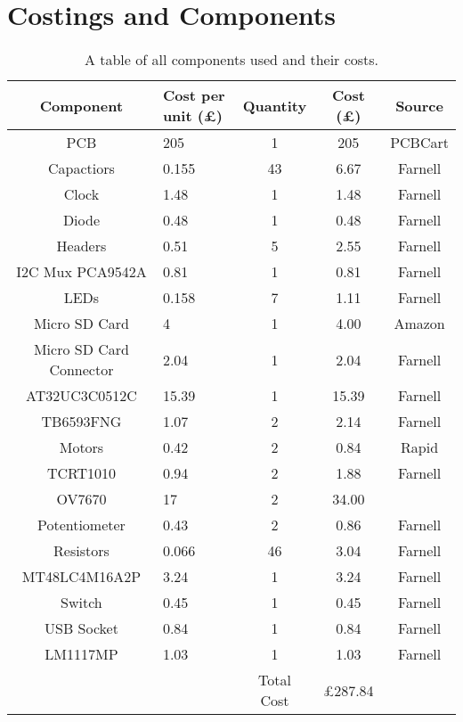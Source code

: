 \chapter{Costings and Components} \label{Appendix:Costings}

\begin{table}
\centering
\caption{A table of all components used and their costs.}
\label{table:Costings}
\begin{tabular}{|c|p{2cm}|c|c|c|} \hline
\textbf{Component}	&	\textbf{Cost per unit} (\pounds)	& \textbf{Quantity} 	&	\textbf{Cost} (\pounds)		&	\textbf{Source}		\\ \hline
PCB			&	205						&	1		&	205					&	PCBCart		\\
Capactiors	&	0.155 					& 	43		& 	6.67 				& 	Farnell 	\\
Clock 		& 	1.48					& 	1		&	1.48 				& 	Farnell		\\
Diode		&	0.48					&	1		&	0.48				&	Farnell 	\\
Headers		&	0.51 					&	5		&	2.55				&	Farnell 	\\
I2C Mux PCA9542A &	0.81				&	1		&	0.81				&	Farnell		\\
LEDs 		&	0.158					&	7		& 	1.11 				&	Farnell		\\
Micro SD Card &	4						&	1		&	4.00 				&	Amazon 		\\
Micro SD Card Connector & 2.04			&	1		&	2.04				&	Farnell		\\
AT32UC3C0512C	&15.39					&	1		&	15.39				&	Farnell		\\
TB6593FNG 	&	1.07 					&	2 		&	2.14 				&	Farnell 	\\
Motors  	&	0.42					&	2		&	0.84				&	Rapid 		\\
TCRT1010	& 	0.94 					&	2		&	1.88 				&	Farnell 	\\
OV7670		&	17						&	2		&	34.00				& 				\\
Potentiometer	&	0.43				&	2		&	0.86				&	Farnell 	\\
Resistors	&	0.066 					& 	46		&	3.04 				&	Farnell 	\\
MT48LC4M16A2P	& 3.24  				& 	1		&	3.24 				&	Farnell		\\
Switch		&	0.45					&	1		&	0.45				&	Farnell 	\\
USB Socket	&	0.84 					&	1		& 	0.84 				&	Farnell 	\\
LM1117MP	&	1.03					&	1		&	1.03	 			&	Farnell		\\ \hline \cline{3-4}
\multicolumn{2}{c|}{ }					& Total Cost  & \pounds 287.84		&	\multicolumn{1}{|c}{ }			\\ \cline{3-4}
\end{tabular}
\end{table}


